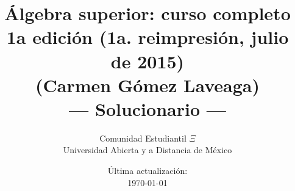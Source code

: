 \documentclass[12pt]{book}
\title{Álgebra superior: curso completo  \\ 1a edición (1a. reimpresión, julio de 2015) \\ (Carmen Gómez Laveaga) \\ --- Solucionario ---}
\author{Comunidad Estudiantil $\Xi$ \\ Universidad Abierta y a Distancia de México}
\date{Última actualización: \\ \today}
\begin{document}
\maketitle

\newcommand{\solucion}{\underline{Solución} \vspace*{0.2cm}}

\tableofcontents

\setcounter{chapter}{-1}
















\end{document}

